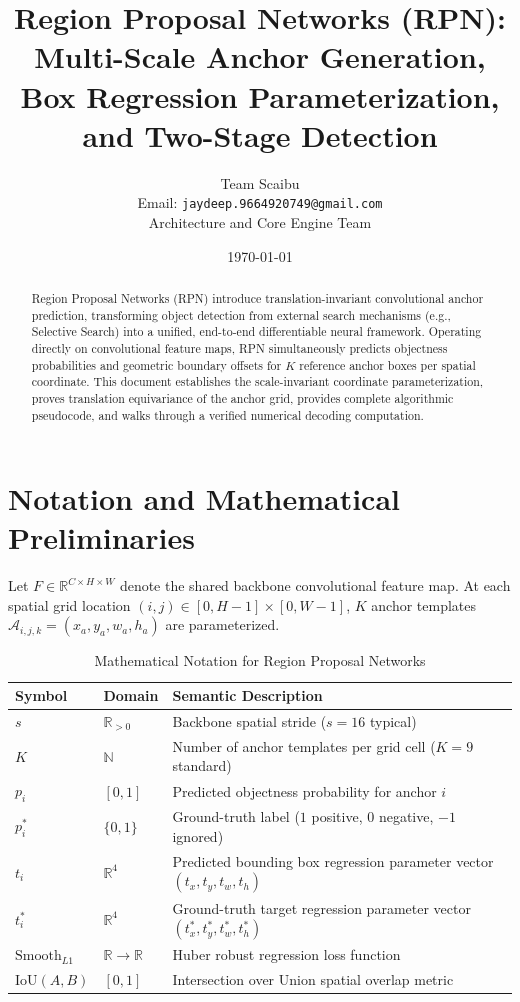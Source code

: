 \documentclass[11pt,a4paper]{article}
\title{Region Proposal Networks (RPN): Multi-Scale Anchor Generation, Box Regression Parameterization, and Two-Stage Detection}
\author{Team Scaibu \\ \small Email: \texttt{jaydeep.9664920749@gmail.com} \\ \small Architecture and Core Engine Team}
\date{\today}
\theoremstyle{definition}
\begin{document}
\maketitle

\begin{abstract}
Region Proposal Networks (RPN) introduce translation-invariant convolutional anchor prediction, transforming object detection from external search mechanisms (e.g., Selective Search) into a unified, end-to-end differentiable neural framework. Operating directly on convolutional feature maps, RPN simultaneously predicts objectness probabilities and geometric boundary offsets for $K$ reference anchor boxes per spatial coordinate. This document establishes the scale-invariant coordinate parameterization, proves translation equivariance of the anchor grid, provides complete algorithmic pseudocode, and walks through a verified numerical decoding computation.
\end{abstract}

\section{Notation and Mathematical Preliminaries}

Let $F \in \mathbb{R}^{C \times H \times W}$ denote the shared backbone convolutional feature map. At each spatial grid location $(i, j) \in [0, H-1] \times [0, W-1]$, $K$ anchor templates $\mathcal{A}_{i,j,k} = (x_a, y_a, w_a, h_a)$ are parameterized.

\begin{table}[h]
\centering
\caption{Mathematical Notation for Region Proposal Networks}
\begin{tabular}{lll}
\toprule
\textbf{Symbol} & \textbf{Domain} & \textbf{Semantic Description} \\
\midrule
$s$ & $\mathbb{R}_{> 0}$ & Backbone spatial stride ($s = 16$ typical) \\
$K$ & $\mathbb{N}$ & Number of anchor templates per grid cell ($K = 9$ standard) \\
$p_i$ & $[0, 1]$ & Predicted objectness probability for anchor $i$ \\
$p_i^*$ & $\{0, 1\}$ & Ground-truth label ($1$ positive, $0$ negative, $-1$ ignored) \\
$t_i$ & $\mathbb{R}^4$ & Predicted bounding box regression parameter vector $(t_x, t_y, t_w, t_h)$ \\
$t_i^*$ & $\mathbb{R}^4$ & Ground-truth target regression parameter vector $(t_x^*, t_y^*, t_w^*, t_h^*)$ \\
$\text{Smooth}_{L1}$ & $\mathbb{R} \to \mathbb{R}$ & Huber robust regression loss function \\
$\text{IoU}(A, B)$ & $[0, 1]$ & Intersection over Union spatial overlap metric \\
\bottomrule
\end{tabular}
\end{table}
\end{document}

